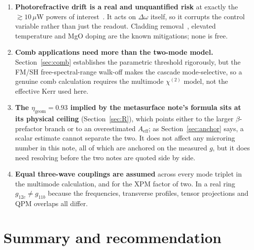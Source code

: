 \documentclass[11pt,a4paper]{article}
\newcommand{\chitwo}{\chi^{(2)}}
\newcommand{\Dom}{\Delta\omega}
\newcommand{\Aeff}{A_{\text{eff}}}
\begin{document}
\begin{enumerate}[leftmargin=1.8em,itemsep=3pt]
  establish that the thermal background is comparable to or larger than
  the cascaded Kerr, which is robust across that whole parameter range;
  none of the cascade physics depends on it.
\item \textbf{Photorefractive drift is a real and unquantified risk} at
  exactly the $\gtrsim10\,\mu$W powers of interest~\cite{Lu2020}.  It
  acts on $\Dom$ itself, so it corrupts the control variable rather than
  just the readout.  Cladding removal~\cite{Xu2021}, elevated
  temperature and MgO doping are the known mitigations; none is free.
\item \textbf{Comb applications need more than the two-mode model.}
  Section~\ref{sec:comb} establishes the parametric threshold
  rigorously, but the FM/SH free-spectral-range walk-off makes the
  cascade mode-selective, so a genuine comb calculation requires the
  multimode $\chitwo$ model, not the effective Kerr used here.
\item \textbf{The $\eta_{\text{geom}}=0.93$ implied by the metasurface
  note's formula sits at its physical ceiling}
  (Section~\ref{sec:R}), which points either to the larger
  $\beta$-prefactor branch or to an overestimated $\Aeff$; as
  Section~\ref{sec:anchor} says, a scalar estimate cannot separate the
  two.  It does not affect any microring number in this note, all of
  which are anchored on the measured $g$, but it does need resolving
  before the two notes are quoted side by side.
\item \textbf{Equal three-wave couplings are assumed} across every mode
  triplet in the multimode calculation, and for the XPM factor of two.
  In a real ring $g_{12c}\neq g_{11b}$ because the frequencies, transverse
  profiles, tensor projections and QPM overlaps all differ.
\end{enumerate}

\section{Summary and recommendation}\label{sec:summary}
\end{document}
